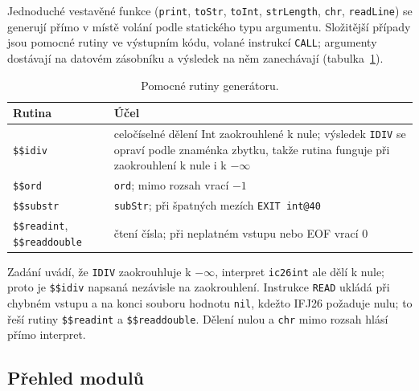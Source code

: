 \documentclass[11pt]{article}
\newcommand{\file}[1]{\texttt{#1}}                   %
\newcommand{\ic}[1]{\texttt{#1}}                     %
\begin{document}
Jednoduché vestavěné funkce (\texttt{print}, \texttt{toStr}, \texttt{toInt}, \texttt{strLength}, \texttt{chr}, \texttt{readLine}) se generují přímo v místě volání podle statického typu argumentu. Složitější případy jsou pomocné rutiny ve výstupním kódu, volané instrukcí \ic{CALL}; argumenty dostávají na datovém zásobníku a výsledek na něm zanechávají (tabulka~\ref{tab:helpers}).

\begin{table}[ht]
\centering
\begin{tabularx}{\linewidth}{@{}lX@{}}
  \toprule
  Rutina & Účel \\
  \midrule
  \ic{\$\$idiv} & celočíselné dělení Int zaokrouhlené k nule; výsledek \ic{IDIV} se opraví podle znaménka zbytku, takže rutina funguje při zaokrouhlení k nule i k $-\infty$ \\
  \ic{\$\$ord} & \texttt{ord}; mimo rozsah vrací $-1$ \\
  \ic{\$\$substr} & \texttt{subStr}; při špatných mezích \ic{EXIT int@40} \\
  \ic{\$\$readint}, \ic{\$\$readdouble} & čtení čísla; při neplatném vstupu nebo EOF vrací 0 \\
  \bottomrule
\end{tabularx}
\caption{Pomocné rutiny generátoru.}
\label{tab:helpers}
\end{table}

Zadání uvádí, že \ic{IDIV} zaokrouhluje k $-\infty$, interpret \file{ic26int} ale dělí k nule; proto je \ic{\$\$idiv} napsaná nezávisle na zaokrouhlení. Instrukce \ic{READ} ukládá při chybném vstupu a na konci souboru hodnotu \ic{nil}, kdežto IFJ26 požaduje nulu; to řeší rutiny \ic{\$\$readint} a \ic{\$\$readdouble}. Dělení nulou a \texttt{chr} mimo rozsah hlásí přímo interpret.

\subsection{Přehled modulů}
\end{document}
